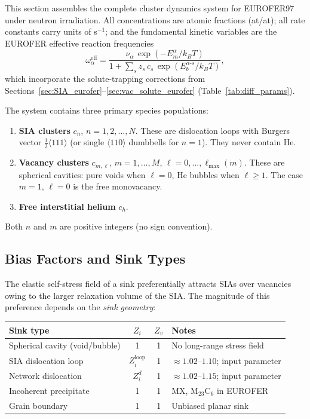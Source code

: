 \documentclass[pdflatex,sn-basic]{sn-jnl} %
\begin{document}
This section assembles the complete cluster dynamics system for EUROFER97
under neutron irradiation. All concentrations are atomic fractions (at/at);
all rate constants carry units of s$^{-1}$; and the fundamental kinetic
variables are the EUROFER effective reaction frequencies
\begin{equation}\label{eq:omega_eff}
    \omega_\alpha^{\mathrm{eff}}
    = \frac{\nu_\alpha\,\exp(-E_m^\alpha/k_BT)}
           {1 + \sum_s z_s\,c_s\,\exp(E_b^{\alpha\text{-}s}/k_BT)},
\end{equation}
which incorporate the solute-trapping corrections from
Sections~\ref{sec:SIA_eurofer}--\ref{sec:vac_solute_eurofer}
(Table~\ref{tab:diff_params}).

The system contains three primary species populations:
\begin{enumerate}
    \item \textbf{SIA clusters} $c_{n}$, $n = 1,2,\ldots,N$. These are
    dislocation loops with Burgers vector $\tfrac{1}{2}\langle111\rangle$
    (or single $\langle110\rangle$ dumbbells for $n=1$). They never
    contain He.
    \item \textbf{Vacancy clusters} $c_{m,\ell}$,
    $m = 1,\ldots,M$, $\ell = 0,\ldots,\ell_{\max}(m)$.  These are
    spherical cavities: pure voids when $\ell = 0$, He bubbles when
    $\ell \geq 1$.  The case $m=1$, $\ell=0$ is the free monovacancy.
    \item \textbf{Free interstitial helium} $c_h$.
\end{enumerate}
Both $n$ and $m$ are positive integers (no sign convention).


\subsection{Bias Factors and Sink Types}
\label{sec:bias}

The elastic self-stress field of a sink preferentially attracts SIAs
over vacancies owing to the larger relaxation volume of the SIA.  The
magnitude of this preference depends on the \emph{sink geometry}:

\begin{center}
\renewcommand{\arraystretch}{1.15}
\begin{tabular}{@{}lccl@{}}
\toprule
\textbf{Sink type} & $Z_i$ & $Z_v$ & \textbf{Notes} \\
\midrule
Spherical cavity (void/bubble) & 1 & 1
  & No long-range stress field \\
SIA dislocation loop & $Z_i^{\mathrm{loop}}$ & 1
  & $\approx 1.02$--$1.10$; input parameter \\
Network dislocation & $Z_i^d$ & 1
  & $\approx 1.02$--$1.15$; input parameter \\
Incoherent precipitate & 1 & 1
  & MX, M$_{23}$C$_6$ in EUROFER \\
Grain boundary & 1 & 1
  & Unbiased planar sink \\
\bottomrule
\end{tabular}
\end{center}
\end{document}
